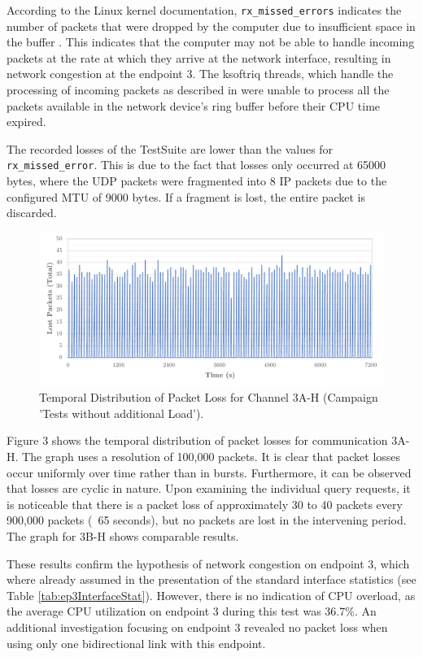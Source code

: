 According to the Linux kernel documentation, \texttt{rx\_missed\_errors} indicates the number of packets that were dropped by the computer due to insufficient space in the buffer \cite{sock11}. This indicates that the computer may not be able to handle incoming packets at the rate at which they arrive at the network interface, resulting in network congestion at the endpoint 3. The ksoftriq threads, which handle the processing of incoming packets as described in \label{chap:recpath} were unable to process all the packets available in the network device's ring buffer before their CPU time expired.

The recorded losses of the TestSuite are lower than the values for \texttt{rx\_missed\_error}. This is due to the fact that losses only occurred at 65000 bytes, where the UDP packets were fragmented into 8 IP packets due to the configured MTU of 9000 bytes. If a fragment is lost, the entire packet is discarded.

\begin{figure}[h!]
    \centering
    \includegraphics[width=1\linewidth]{figures/reliability/ihawk/diagr6.pdf}
    \caption{Temporal Distribution of Packet Loss for Channel 3A-H (Campaign 'Tests without additional Load').}
    \label{fig:diagr6Temp}
\end{figure}

Figure 3 shows the temporal distribution of packet losses for communication 3A-H. The graph uses a resolution of 100,000 packets.  It is clear that packet losses occur uniformly over time rather than in bursts. Furthermore, it can be observed that losses are cyclic in nature. Upon examining the individual query requests, it is noticeable that there is a packet loss of approximately 30 to 40 packets every 900,000 packets (~65 seconds), but no packets are lost in the intervening period. The graph for 3B-H shows comparable results.

These results confirm the hypothesis of network congestion on endpoint 3, which where already assumed in the presentation of the standard interface statistics (see Table \ref{tab:ep3InterfaceStat}). However, there is no indication of CPU overload, as the average CPU utilization on endpoint 3 during this test was 36.7\%. An additional investigation focusing on endpoint 3 revealed no packet loss when using only one bidirectional link with this endpoint.

